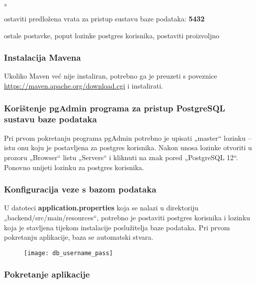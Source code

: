 {\begin{list}{$\circ$}{}
				\item  ostaviti predložena vrata za pristup
				sustavu baze podataka: \textbf{5432}
				\item  ostale postavke, poput lozinke postgres korisnika, postaviti proizvoljno
			\end{list}
		
			\subsubsection{Instalacija Mavena}
			Ukoliko Maven već nije instaliran, potrebno ga je preuzeti s poveznice\newline
			\href{https://maven.apache.org/download.cgi}{\underline{https://maven.apache.org/download.cgi}} i instalirati.
		
			\subsubsection{Korištenje pgAdmin programa za pristup PostgreSQL sustavu baze podataka}
			
			Pri prvom pokretanju programa pgAdmin potrebno je upisati
			„master“ lozinku – istu onu koju je postavljena za postgres korisnika.
			Nakon unosa lozinke otvoriti u prozoru „Browser“ listu
			„Servers“ i kliknuti na znak pored „PostgreSQL 12“.
			Ponovno unijeti lozinku za postgres korisnika.
			
			\subsubsection{Konfiguracija veze s bazom podataka}
			U datoteci \textbf{application.properties} koja se nalazi u direktoriju
			\newline
			„backend/src/main/resources“, potrebno je postaviti postgres korisnika i lozinku koja je stavljena tijekom instalacije poslužitelja baze podataka. Pri prvom pokretanju aplikacije, baza se automatski stvara.
			
			\begin{figure}[H]
				\texttt{[image: db\_username\_pass]}
			\end{figure}
		
			\eject
		
			\subsubsection{Pokretanje aplikacije}

}
